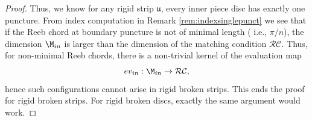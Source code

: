 \begin{proof}
Thus, we know for any rigid strip $\mathfrak u$, every inner piece disc has exactly one puncture. From index computation in Remark \ref{rem:indexsinglepunct} we see that if the Reeb chord at boundary puncture is not of minimal length ( i.e., $\pi/n$), the dimension $\M_{in}$ is larger than the dimension of the matching condition $\mathcal{RC}$. Thus, for non-minimal Reeb chords, there is a non-trivial kernel of the evaluation map $$ev_{in} : \M_{in} \to \mathcal{RC},$$ hence such configurations cannot arise in rigid broken strips. This ends the proof for rigid broken strips. For rigid broken discs, exactly the same argument would work.
\end{proof}

